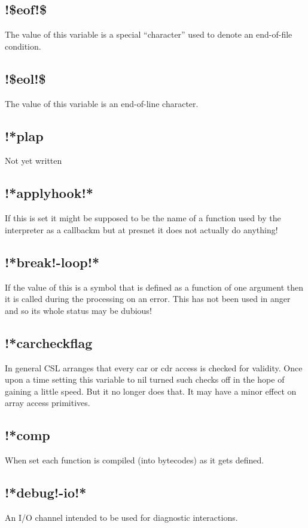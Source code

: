 \documentclass[a4paper,11pt]{article}
\begin{document}
\subsection{\ttfamily !\$eof!\$}
   The value of this variable is a special ``character'' used to denote an
   end-of-file condition.
  

\subsection{\ttfamily !\$eol!\$}
   The value of this variable is an end-of-line character.

\subsection{\ttfamily !*plap}
   Not yet written

\subsection{\ttfamily !*applyhook!*}
   If this is set it might be supposed to be the name of a function used
   by the interpreter as a callbackm but at presnet it does not actually do
   anything!

\subsection{\ttfamily !*break!-loop!*}
   If the value of this is a symbol that is defined as a function of one
   argument then it is called during the processing on an error. This has not
   been used in anger and so its whole status may be dubious!

\subsection{\ttfamily !*carcheckflag}
   In general CSL arranges that every {\ttfamily car} or {\ttfamily cdr} access
   is checked for validity. Once upon a time setting this variable to nil
   turned such checks off in the hope of gaining a little speed. But it no
   longer does that. It may have a minor effect on array access primitives.

\subsection{\ttfamily !*comp}
   When set each function is compiled (into bytecodes) as it gets defined.

\subsection{\ttfamily !*debug!-io!*}
   An I/O channel intended to be used for diagnostic interactions.
\end{document}
